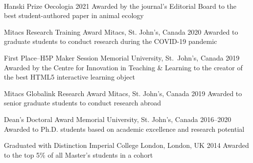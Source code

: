 \\


  \mycvhonor
    {Hanski Prize} %
    {Oecologia} %
    {2021} %
    {
    Awarded by the journal's Editorial Board to the best student-authored paper in animal ecology
    } %

  \mycvhonor
    {Mitacs Research Training Award} %
    {Mitacs, St. John's, Canada} %
    {2020} %
    {
    Awarded to graduate students to conduct research during the COVID-19 pandemic
    } %

  \mycvhonor
    {First Place--H5P Maker Session} %
    {Memorial University, St.~John's, Canada} %
    {2019} %
    {
    Awarded by the Centre for Innovation in Teaching \& Learning to the creator of the best HTML5 interactive learning object 
    } %

  \mycvhonor
    {Mitacs Globalink Research Award} %
    {Mitacs, St. John's, Canada} %
    {2019} %
    {
     Awarded to senior graduate students to conduct research  abroad
    } %

  \mycvhonor
    {Dean's Doctoral Award} %
    {Memorial University, St. John's, Canada} %
    {2016--2020} %
    {
      Awarded to Ph.D. students based on academic excellence and research potential
    } %

  \mycvhonor
    {Graduated with Distinction} %
    {Imperial College London, London, UK} %
    {2014} %
    {
      Awarded to the top 5\% of all Master's students in a cohort
    } %


